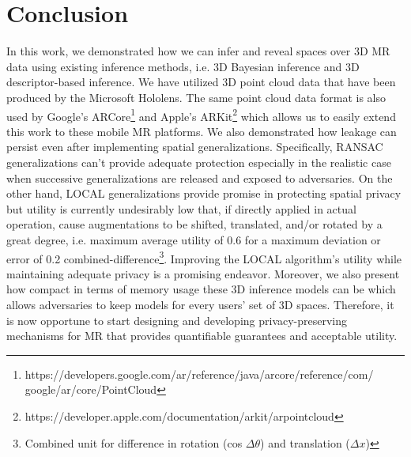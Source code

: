 
\section{Conclusion}\label{sec:conclusion}

In this work, we demonstrated how we can infer and reveal spaces over 3D MR data using existing inference methods, i.e. 3D Bayesian inference and 3D descriptor-based inference. We have utilized 3D point cloud data that have been produced by the Microsoft Hololens. The same point cloud data format is also used by Google's ARCore\footnote{https://developers.google.com/ar/reference/java/arcore/reference/com/\\google/ar/core/PointCloud} and Apple's ARKit\footnote{https://developer.apple.com/documentation/arkit/arpointcloud} which allows us to easily extend this work to these mobile MR platforms. We also demonstrated how leakage can persist even after implementing spatial generalizations. Specifically, RANSAC generalizations can't provide adequate protection especially in the realistic case when successive generalizations are released and exposed to adversaries. On the other hand, LOCAL generalizations provide promise in protecting spatial privacy but utility is currently undesirably low that, if directly applied in actual operation, cause augmentations to be shifted, translated, and/or rotated by a great degree, i.e. maximum average utility of 0.6 for a maximum deviation or error of 0.2 combined-difference\footnote{Combined unit for difference in rotation (cos $\Delta\theta$) and translation ($\Delta x$)}. Improving the LOCAL algorithm's utility while maintaining adequate privacy is a promising endeavor. Moreover, we also present how compact in terms of memory usage these 3D inference models can be which allows adversaries to keep models for every users' set of 3D spaces. Therefore, it is now opportune to start designing and developing privacy-preserving mechanisms for MR that provides quantifiable guarantees and acceptable utility.

